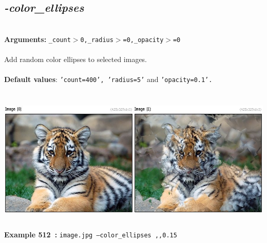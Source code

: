 \documentclass[a4paper,11pt,twoside]{book}
\begin{document}
\subsection{\emph{-color\_ellipses} }\vspace*{-0.5em}
~\\\textbf{Arguments: } 
{\small \texttt{\_count$>$0,\_radius$>$=0,\_opacity$>$=0}}\\~\\
Add random color ellipses to selected images.
~\\~\\\textbf{Default values}: {\small \texttt{'count=400', 'radius=5'} and \texttt{'opacity=0.1'.}}
\begin{center}\includegraphics[keepaspectratio=true,height=7cm,width=\textwidth]{img/gmic_def512.jpg}\\
{\footnotesize \textbf{Example 512~:} \texttt{image.jpg --color\_ellipses ,,0.15}}
\end{center}
\end{document}
